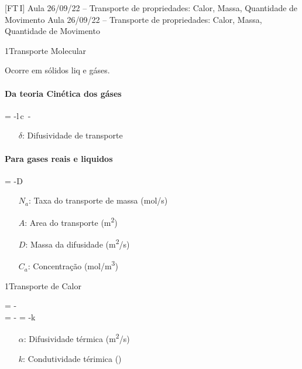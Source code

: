 \documentclass[\mainfilename]{subfiles}
\begin{document}
[FT\,I]
{Aula 26/09/22 -- Transporte de propriedades: Calor, Massa, Quantidade de Movimento}
{Aula 26/09/22 -- Transporte de propriedades: Calor, Massa, Quantidade de Movimento}

\begin{sectionBox}1{Transporte Molecular}
    
    Ocorre em sólidos liq e gáses.

    \paragraph*{Da teoria Cinética dos gáses}
    \begin{BM}
        \Psi
        = -l\,c\,
        \cong 
        -\delta\,
    \end{BM}
    \begin{itemize}
        \item[\(\delta\):] Difusividade de transporte
    \end{itemize}

    \paragraph*{Para gases reais e liquidos}
    \begin{BM}
         = -D\,
    \end{BM}
    \begin{itemize}
        \item[\(N_a\):] Taxa do transporte de massa (\unit{\mole/\second})
        \item[\(A\):] Area do transporte (\unit{\metre^2})
        \item[\(D\):] Massa da difusidade (\unit{\metre^2/\second})
        \item[\(C_a\):] Concentração (\unit{\mole/\metre^3}) 
    \end{itemize}
    
\end{sectionBox}

\begin{sectionBox}1{Transporte de Calor}
    
    \begin{BM}
        \Psi
        = -\delta\,
        \\
        = -\alpha
        = -k\,
    \end{BM}
    \begin{itemize}
        \item[\(\alpha\):] Difusividade térmica (\unit{\metre^2/\second})
        \item[\(k\):] Condutividade térimica (\unit{\frac{\joule}{\metre\,\celsius\,\second}})
    \end{itemize}
    
\end{sectionBox}
\end{document}
